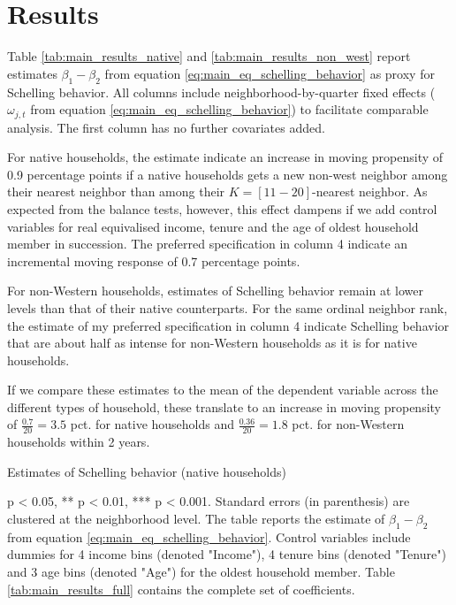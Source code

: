 \documentclass[../main.tex]{subfiles}
\begin{document}
\section{Results}
\label{sec:results}

Table \ref{tab:main_results_native} and \ref{tab:main_results_non_west} report estimates $\beta_1-\beta_2$ from equation \ref{eq:main_eq_schelling_behavior} as proxy for Schelling behavior. All columns include neighborhood-by-quarter fixed effects ($\omega_{j,t}$ from equation \ref{eq:main_eq_schelling_behavior}) to facilitate comparable analysis. The first column has no further covariates added. 

For native households, the estimate indicate an increase in moving propensity of 0.9 percentage points if a native households gets a new non-west neighbor among their nearest neighbor than among their $K=[11-20]$-nearest neighbor. As expected from the balance tests, however, this effect dampens if we add control variables for real equivalised income, tenure and the age of oldest household member in succession. The preferred specification in column 4 indicate an incremental moving response of 0.7 percentage points. 

For non-Western households, estimates of Schelling behavior remain at lower levels than that of their native counterparts. For the same ordinal neighbor rank, the estimate of my preferred specification in column 4 indicate Schelling behavior that are about half as intense for non-Western households as it is for native households. 

If we compare these estimates to the mean of the dependent variable across the different types of household, these translate to an increase in moving propensity of $\frac{0.7}{20} = 3.5$ pct. for native households and $\frac{0.36}{20}=1.8$ pct. for non-Western households within 2 years. 

\begin{table}[H]
    \caption{Estimates of Schelling behavior (native households)}
    \label{tab:main_results_native}
    \begin{threeparttable}
            
    \begin{tablenotes}[flushleft]
    \item \scriptsize * p < 0.05, ** p < 0.01, *** p < 0.001. Standard errors (in parenthesis) are clustered at the neighborhood level. The table reports the estimate of $\beta_1 - \beta_2$ from equation \ref{eq:main_eq_schelling_behavior}. Control variables include dummies for 4 income bins (denoted "Income"), 4 tenure bins (denoted "Tenure") and 3 age bins (denoted "Age") for the oldest household member. Table \ref{tab:main_results_full} contains the complete set of coefficients.
    \end{tablenotes}
    \end{threeparttable}
\end{table}
\end{document}
